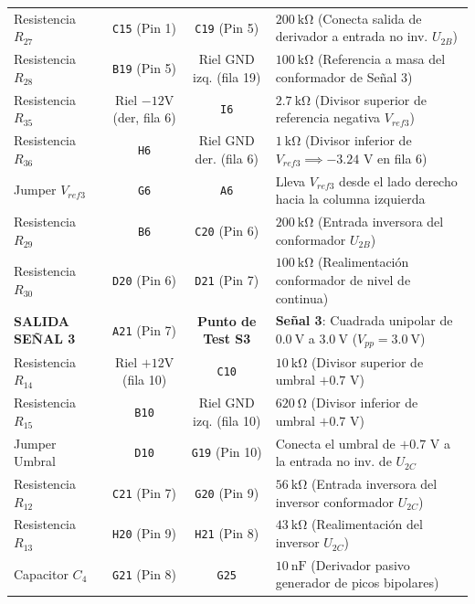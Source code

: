 \documentclass[10pt, a4paper]{article}
\begin{document}
\begin{center}
\begin{tabularx}{\textwidth}{l c c X}
\midrule
Resistencia $R_{27}$ & \texttt{C15} (Pin 1) & \texttt{C19} (Pin 5) & $\SI{200}{\kilo\ohm}$ (Conecta salida de derivador a entrada no inv. $U_{2B}$) \\
\rowcolor{softgray} Resistencia $R_{28}$ & \texttt{B19} (Pin 5) & Riel GND izq. (fila 19) & $\SI{100}{\kilo\ohm}$ (Referencia a masa del conformador de Señal 3) \\
Resistencia $R_{35}$ & Riel $-12\text{V}$ (der, fila 6) & \texttt{I6} & $\SI{2.7}{\kilo\ohm}$ (Divisor superior de referencia negativa $V_{ref3}$) \\
\rowcolor{softgray} Resistencia $R_{36}$ & \texttt{H6} & Riel GND der. (fila 6) & $\SI{1}{\kilo\ohm}$ (Divisor inferior de $V_{ref3} \implies -3.24\text{ V}$ en fila 6) \\
Jumper $V_{ref3}$ & \texttt{G6} & \texttt{A6} & Lleva $V_{ref3}$ desde el lado derecho hacia la columna izquierda \\
\rowcolor{softgray} Resistencia $R_{29}$ & \texttt{B6} & \texttt{C20} (Pin 6) & $\SI{200}{\kilo\ohm}$ (Entrada inversora del conformador $U_{2B}$) \\
Resistencia $R_{30}$ & \texttt{D20} (Pin 6) & \texttt{D21} (Pin 7) & $\SI{100}{\kilo\ohm}$ (Realimentación conformador de nivel de continua) \\
\rowcolor{utnblue!15} \textbf{SALIDA SEÑAL 3} & \texttt{A21} (Pin 7) & \textbf{Punto de Test S3} & \textbf{Señal 3}: Cuadrada unipolar de $\SI{0.0}{\volt}$ a $\SI{+3.0}{\volt}$ ($V_{pp}=\SI{3.0}{\volt}$) \\
\midrule
Resistencia $R_{14}$ & Riel $+12\text{V}$ (fila 10) & \texttt{C10} & $\SI{10}{\kilo\ohm}$ (Divisor superior de umbral $+0.7\text{ V}$) \\
\rowcolor{softgray} Resistencia $R_{15}$ & \texttt{B10} & Riel GND izq. (fila 10) & $\SI{620}{\ohm}$ (Divisor inferior de umbral $+0.7\text{ V}$) \\
Jumper Umbral & \texttt{D10} & \texttt{G19} (Pin 10) & Conecta el umbral de $+0.7\text{ V}$ a la entrada no inv. de $U_{2C}$ \\
\rowcolor{softgray} Resistencia $R_{12}$ & \texttt{C21} (Pin 7) & \texttt{G20} (Pin 9) & $\SI{56}{\kilo\ohm}$ (Entrada inversora del inversor conformador $U_{2C}$) \\
Resistencia $R_{13}$ & \texttt{H20} (Pin 9) & \texttt{H21} (Pin 8) & $\SI{43}{\kilo\ohm}$ (Realimentación del inversor $U_{2C}$) \\
\midrule
Capacitor $C_4$ & \texttt{G21} (Pin 8) & \texttt{G25} & $\SI{10}{\nano\farad}$ (Derivador pasivo generador de picos bipolares) \\

\end{tabularx}
\end{center}
\end{document}
